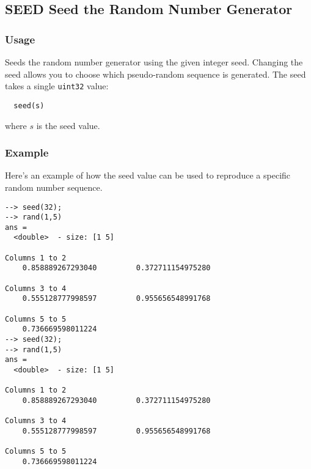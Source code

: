 %
%
%
\subsection{SEED Seed the Random Number Generator}
\subsubsection{Usage}
Seeds the random number generator using the given integer seed.  
Changing the seed allows you to choose which pseudo-random
sequence is generated.  The seed takes a single \verb|uint32| value:
\begin{verbatim}
  seed(s)
\end{verbatim}
where $s$ is the seed value.
\subsubsection{Example}
Here's an example of how the seed value can be used to reproduce
a specific random number sequence.
\begin{verbatim}
--> seed(32);
--> rand(1,5)
ans =
  <double>  - size: [1 5]
  
Columns 1 to 2
    0.858889267293040         0.372711154975280
  
Columns 3 to 4
    0.555128777998597         0.955656548991768
  
Columns 5 to 5
    0.736669598011224
--> seed(32);
--> rand(1,5)
ans =
  <double>  - size: [1 5]
  
Columns 1 to 2
    0.858889267293040         0.372711154975280
  
Columns 3 to 4
    0.555128777998597         0.955656548991768
  
Columns 5 to 5
    0.736669598011224
\end{verbatim}
